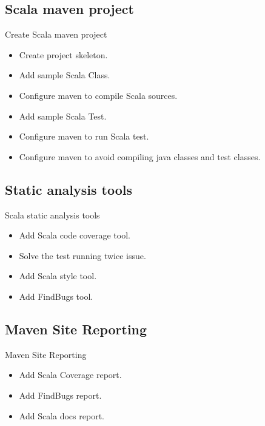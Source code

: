 \documentclass[
    aspectratio=1610
]{beamer}
\begin{document}
    \subsection{Scala maven project}\label{subsec:scala-maven-project}
    \begin{frame}{Create Scala maven project}
        \begin{itemize}[<+- | alert@+>]
            \item Create project skeleton.
            \item Add sample Scala Class.
            \item Configure maven to compile Scala sources.
            \item Add sample Scala Test.
            \item Configure maven to run Scala test.
            \item Configure maven to avoid compiling java classes and test classes.
        \end{itemize}
    \end{frame}

    \subsection{Static analysis tools}\label{subsec:static-analysis-tools}
    \begin{frame}{Scala static analysis tools}
        \begin{itemize}[<+- | alert@+>]
            \item Add Scala code coverage tool.
            \item Solve the test running twice issue.
            \item Add Scala style tool.
            \item Add FindBugs tool.
        \end{itemize}
    \end{frame}

    \subsection{Maven Site Reporting}\label{subsec:maven-site-reporting}
    \begin{frame}{Maven Site Reporting}
        \begin{itemize}[<+- | alert@+>]
            \item Add Scala Coverage report.
            \item Add FindBugs report.
            \item Add Scala docs report.
        \end{itemize}
    \end{frame}
\end{document}
